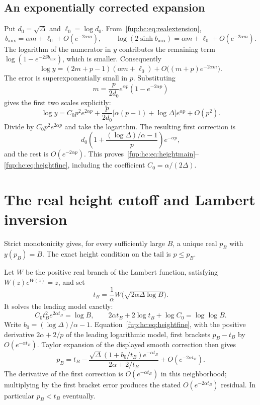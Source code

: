 \documentclass[11pt,letterpaper]{article}
\theoremstyle{definition}\newtheorem{definition}[theorem]{Definition}
\theoremstyle{remark}\newtheorem{remark}[theorem]{Remark}
\begin{document}
\subsection{An exponentially corrected expansion}
Put $d_0=\sqrt\Delta$ and $\ell_0=\log d_0$. From~\eqref{fup:hc:eq:realextension},
\[
 b_{\mathrm{aux}}=\alpha m+\ell_0+O(e^{-2\alpha m}),\qquad
 \log(2\sinh b_{\mathrm{aux}})=\alpha m+\ell_0+O(e^{-2\alpha m}).
\]
The logarithm of the numerator in $y$ contributes the remaining term $\log(1-e^{-2Sb_{\mathrm{aux}}})$, which is smaller. Consequently
\begin{equation}\label{fup:hc:eq:logym}
 \log y=(2m+p-1)(\alpha m+\ell_0)
                 +O\bigl((m+p)e^{-2\alpha m}\bigr).
\end{equation}
The error is superexponentially small in $p$. Substituting
\[
 m=\frac{p}{2d_0}e^{\alpha p}(1-e^{-2\alpha p})
\]
gives the first two scales explicitly:
\begin{equation}\label{fup:hc:eq:twoscales}
 \log y=C_0p^2e^{2\alpha p}
   +\frac{p}{2d_0}\bigl[\alpha(p-1)+\log\Delta\bigr]e^{\alpha p}
   +O(p^2).
\end{equation}
Divide by $C_0p^2e^{2\alpha p}$ and take the logarithm. The resulting first correction is
\[
 d_0\left(1+\frac{(\log\Delta)/\alpha-1}{p}\right)e^{-\alpha p},
\]
and the rest is $O(e^{-2\alpha p})$. This proves~\eqref{fup:hc:eq:heightmain}--\eqref{fup:hc:eq:heightfine}, including the coefficient $C_0=\alpha/(2\Delta)$.

\section{The real height cutoff and Lambert inversion}\label{fup:hc:sec:inverse}
Strict monotonicity gives, for every sufficiently large $B$, a unique real $p_B$ with $y(p_B)=B$. The exact height condition on the tail is $p\le p_B$.

Let $W$ be the positive real branch of the Lambert function, satisfying $W(z)e^{W(z)}=z$, and set
\begin{equation}\label{fup:hc:eq:lambert}
 t_B=\frac1\alpha W\bigl(\sqrt{2\alpha\Delta\log B}\bigr).
\end{equation}
It solves the leading model exactly:
\[
 C_0t_B^2e^{2\alpha t_B}=\log B,\qquad
 2\alpha t_B+2\log t_B+\log C_0=\log\log B.
\]
Write $b_0=(\log\Delta)/\alpha-1$. Equation~\eqref{fup:hc:eq:heightfine}, with the positive derivative $2\alpha+2/p$ of the leading logarithmic model, first brackets $p_B-t_B$ by $O(e^{-\alpha t_B})$. Taylor expansion of the displayed smooth correction then gives
\begin{equation}\label{fup:hc:eq:fineinverse}
 p_B=t_B-
 \frac{\sqrt\Delta(1+b_0/t_B)e^{-\alpha t_B}}{2\alpha+2/t_B}
       +O(e^{-2\alpha t_B}).
\end{equation}
The derivative of the first correction is $O(e^{-\alpha t_B})$ in this neighborhood; multiplying by the first bracket error produces the stated $O(e^{-2\alpha t_B})$ residual. In particular $p_B<t_B$ eventually.
\end{document}
